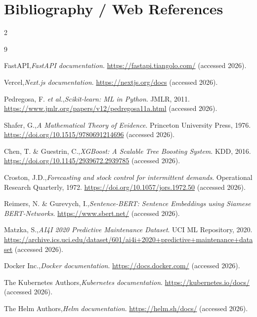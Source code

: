 \section*{Bibliography / Web References}

\begin{small}
\begin{multicols}{2}
\begin{thebibliography}{9}
\setlength{\itemsep}{0pt}
\setlength{\parsep}{0pt}
\setlength{\parskip}{0pt}

FastAPI,\emph{FastAPI documentation}. \url{https://fastapi.tiangolo.com/} (accessed 2026).

Vercel,\emph{Next.js documentation}. \url{https://nextjs.org/docs} (accessed 2026).

Pedregosa, F. \emph{et al.},\emph{Scikit-learn: ML in Python}. JMLR, 2011. \url{https://www.jmlr.org/papers/v12/pedregosa11a.html} (accessed 2026).

Shafer, G.,\emph{A Mathematical Theory of Evidence}. Princeton University Press, 1976. \url{https://doi.org/10.1515/9780691214696} (accessed 2026).

Chen, T. \& Guestrin, C.,\emph{XGBoost: A Scalable Tree Boosting System}. KDD, 2016. \url{https://doi.org/10.1145/2939672.2939785} (accessed 2026).

Croston, J.D.,\emph{Forecasting and stock control for intermittent demands}. Operational Research Quarterly, 1972. \url{https://doi.org/10.1057/jors.1972.50} (accessed 2026).

Reimers, N. \& Gurevych, I.,\emph{Sentence-BERT: Sentence Embeddings using Siamese BERT-Networks}. \url{https://www.sbert.net/} (accessed 2026).

Matzka, S.,\emph{AI4I 2020 Predictive Maintenance Dataset}. UCI ML Repository, 2020. \url{https://archive.ics.uci.edu/dataset/601/ai4i+2020+predictive+maintenance+dataset} (accessed 2026).

Docker Inc.,\emph{Docker documentation}. \url{https://docs.docker.com/} (accessed 2026).

The Kubernetes Authors,\emph{Kubernetes documentation}. \url{https://kubernetes.io/docs/} (accessed 2026).

The Helm Authors,\emph{Helm documentation}. \url{https://helm.sh/docs/} (accessed 2026).


\end{thebibliography}
\end{multicols}
\end{small}
